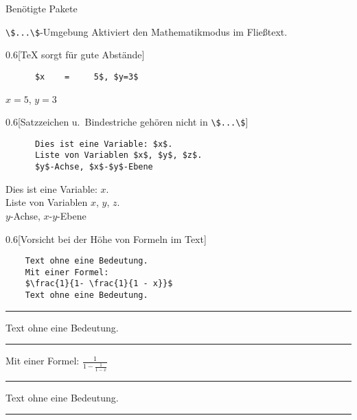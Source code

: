 \begin{frame}[fragile,t]{
  Benötigte Pakete
  \hfill{}
}
  \hfill{}

  \vspace{5pt}
\end{frame}

\begin{frame}[fragile]{\lstinline+\$...\$+-Umgebung}
  Aktiviert den Mathematikmodus im Fließtext.

  \begin{CodeExample}{0.6}[\TeX{} sorgt für gute Abstände]
    \begin{lstlisting}
      $x    =     5$, $y=3$
    \end{lstlisting}
  \CodeResult
      $x    =     5$, $y=3$
  \end{CodeExample}

  \begin{CodeExample}{0.6}[Satzzeichen u.\ Bindestriche gehören nicht in \lstinline+\$...\$+]
    \begin{lstlisting}
      Dies ist eine Variable: $x$.
      Liste von Variablen $x$, $y$, $z$.
      $y$-Achse, $x$-$y$-Ebene
    \end{lstlisting}
  \CodeResult
    Dies ist eine Variable: $x$. \\
    Liste von Variablen $x$, $y$, $z$. \\
    $y$-Achse, $x$-$y$-Ebene
  \end{CodeExample}
  \begin{CodeExample}{0.6}[Vorsicht bei der Höhe von Formeln im Text]
    \begin{lstlisting}
    Text ohne eine Bedeutung.
    Mit einer Formel:
    $\frac{1}{1- \frac{1}{1 - x}}$
    Text ohne eine Bedeutung.
    \end{lstlisting}
  \CodeResult
    \hrule
    Text ohne eine Bedeutung.
    \hrule
    Mit einer Formel: $\frac{1}{1- \frac{1}{1 - x}}$
    \hrule
    Text ohne eine Bedeutung.
    \hrule
  \end{CodeExample}
\end{frame}

